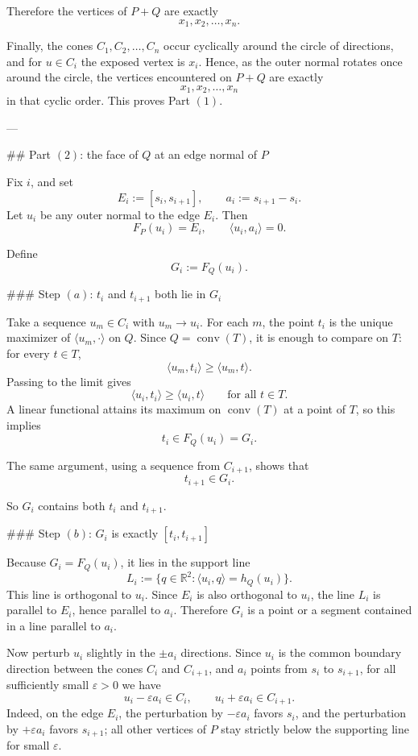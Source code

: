 Therefore the vertices of \(P+Q\) are exactly
\[
x_1,x_2,\dots,x_n.
\]

Finally, the cones \(C_1,C_2,\dots,C_n\) occur cyclically around the circle of directions, and for \(u\in C_i\) the exposed vertex is \(x_i\). Hence, as the outer normal rotates once around the circle, the vertices encountered on \(P+Q\) are exactly
\[
x_1,x_2,\dots,x_n
\]
in that cyclic order. This proves Part \((1)\).

---

## Part \((2)\): the face of \(Q\) at an edge normal of \(P\)

Fix \(i\), and set
\[
E_i:=[s_i,s_{i+1}],
\qquad
a_i:=s_{i+1}-s_i.
\]
Let \(u_i\) be any outer normal to the edge \(E_i\). Then
\[
F_P(u_i)=E_i,
\qquad
\langle u_i,a_i\rangle=0.
\]

Define
\[
G_i:=F_Q(u_i).
\]

### Step \((a)\): \(t_i\) and \(t_{i+1}\) both lie in \(G_i\)

Take a sequence \(u_m\in C_i\) with \(u_m\to u_i\). For each \(m\), the point \(t_i\) is the unique maximizer of \(\langle u_m,\cdot\rangle\) on \(Q\). Since \(Q=\operatorname{conv}(T)\), it is enough to compare on \(T\): for every \(t\in T\),
\[
\langle u_m,t_i\rangle\ge \langle u_m,t\rangle.
\]
Passing to the limit gives
\[
\langle u_i,t_i\rangle\ge \langle u_i,t\rangle
\qquad\text{for all }t\in T.
\]
A linear functional attains its maximum on \(\operatorname{conv}(T)\) at a point of \(T\), so this implies
\[
t_i\in F_Q(u_i)=G_i.
\]

The same argument, using a sequence from \(C_{i+1}\), shows that
\[
t_{i+1}\in G_i.
\]

So \(G_i\) contains both \(t_i\) and \(t_{i+1}\).

### Step \((b)\): \(G_i\) is exactly \([t_i,t_{i+1}]\)

Because \(G_i=F_Q(u_i)\), it lies in the support line
\[
L_i:=\{q\in\mathbb{R}^2:\langle u_i,q\rangle=h_Q(u_i)\}.
\]
This line is orthogonal to \(u_i\). Since \(E_i\) is also orthogonal to \(u_i\), the line \(L_i\) is parallel to \(E_i\), hence parallel to \(a_i\). Therefore \(G_i\) is a point or a segment contained in a line parallel to \(a_i\).

Now perturb \(u_i\) slightly in the \(\pm a_i\) directions. Since \(u_i\) is the common boundary direction between the cones \(C_i\) and \(C_{i+1}\), and \(a_i\) points from \(s_i\) to \(s_{i+1}\), for all sufficiently small \(\varepsilon>0\) we have
\[
u_i-\varepsilon a_i\in C_i,
\qquad
u_i+\varepsilon a_i\in C_{i+1}.
\]
Indeed, on the edge \(E_i\), the perturbation by \(-\varepsilon a_i\) favors \(s_i\), and the perturbation by \(+\varepsilon a_i\) favors \(s_{i+1}\); all other vertices of \(P\) stay strictly below the supporting line for small \(\varepsilon\).

